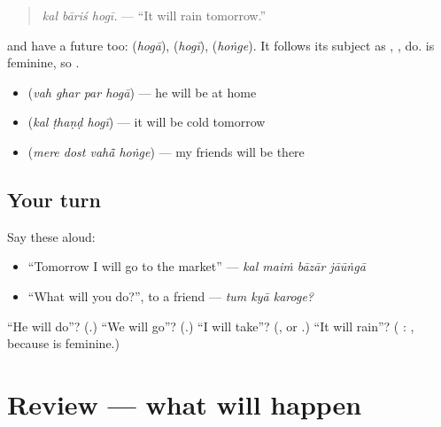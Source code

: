 \begin{quote}
\emph{kal bāriś hogī.} — \textquotedblleft{}It will rain tomorrow.\textquotedblright{}
\end{quote}

\textbf{} and \textbf{} have a future too: \textbf{} (\emph{hogā}), \textbf{} (\emph{hogī}), \textbf{} (\emph{hoṅge}). It follows its subject as \textbf{}, \textbf{}, \textbf{} do. \textbf{} is feminine, so \textbf{}.

\begin{itemize}
\raggedright
  \item \textbf{   } (\emph{vah ghar par hogā}) — he will be at home
  \item \textbf{  } (\emph{kal ṭhaṇḍ hogī}) — it will be cold tomorrow
  \item \textbf{   } (\emph{mere dost vahā̃ hoṅge}) — my friends will be there
\end{itemize}

\subsection*{Your turn}
Say these aloud:

\begin{itemize}
\raggedright
  \item \textquotedblleft{}Tomorrow I will go to the market\textquotedblright{} — \emph{kal maiṁ bāzār jāūṅgā}
  \item \textquotedblleft{}What will you do?\textquotedblright{}, to a friend — \emph{tum kyā karoge?}
\end{itemize}

\begin{tcolorbox}[breakable,colback=teal!4,colframe=teal!35!black,title={Before you move on}]
\textquotedblleft{}He will do\textquotedblright{}? (\textbf{}.) \textquotedblleft{}We will go\textquotedblright{}? (\textbf{}.) \textquotedblleft{}I will take\textquotedblright{}? (\textbf{}, or \textbf{}.) \textquotedblleft{}It will rain\textquotedblright{}? (\textbf{ }: \textbf{}, because \textbf{} is feminine.)
\end{tcolorbox}
\section[(review)]{Review — what will happen}


